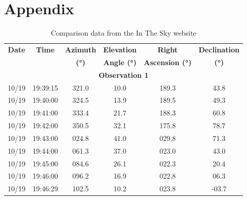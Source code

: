 \documentclass{article}
\begin{document}
\printbibliography

\newpage
\appendix
\section{Appendix} \label{Appendix}

\begin{table}[H]
    \centering
    \caption{Comparison data from the In The Sky website}
    \label{tab:method1_data_comparison}
    \renewcommand{\arraystretch}{1.2}
    \begin{tabular}{|c|c|c|c|c|c|}
        \hline
        \textbf{Date} & \textbf{Time} & \textbf{Azimuth} & \textbf{Elevation} & \textbf{Right} & \textbf{Declination} \\ 
        \textbf{ } & \textbf{ } & \textbf{(°)} & \textbf{Angle (°)} & \textbf{Ascension (°)} & \textbf{(°)} \\ \hline
        \multicolumn{6}{|c|}{\textbf{Observation 1}} \\ \hline
        10/19 & 19:39:15 & 321.0 & 10.0 & 189.3 & 43.8 \\ \hline
        10/19 & 19:40:00 & 324.5 & 13.9 & 189.5 & 49.3 \\ \hline
        10/19 & 19:41:00 & 333.4 & 21.7 & 188.3 & 60.8 \\ \hline
        10/19 & 19:42:00 & 350.5 & 32.1 & 175.8 & 78.7 \\ \hline
        10/19 & 19:43:00 & 024.8 & 41.0 & 029.8 & 71.3 \\ \hline
        10/19 & 19:44:00 & 061.3 & 37.0 & 023.0 & 43.0 \\ \hline
        10/19 & 19:45:00 & 084.6 & 26.1 & 022.3 & 20.4 \\ \hline
        10/19 & 19:46:00 & 096.2 & 16.9 & 022.8 & 06.3 \\ \hline
        10/19 & 19:46:29 & 102.5 & 10.2 & 023.8 & -03.7 \\ \hline
    \end{tabular}
\end{table}
\end{document}
